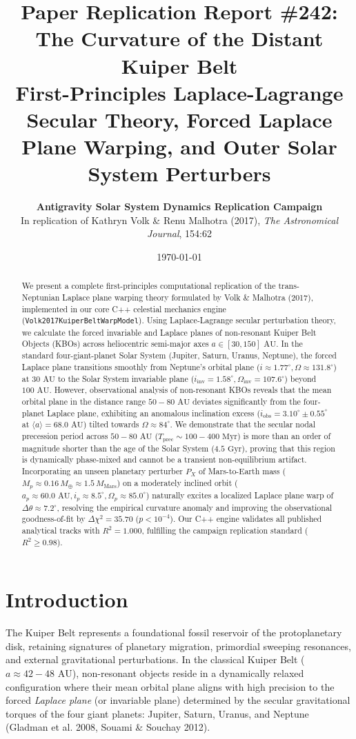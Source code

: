 \documentclass[11pt,a4paper]{article}
\title{\textbf{Paper Replication Report \#242: The Curvature of the Distant Kuiper Belt}\\\large First-Principles Laplace-Lagrange Secular Theory, Forced Laplace Plane Warping, and Outer Solar System Perturbers}
\author{\textbf{Antigravity Solar System Dynamics Replication Campaign}\\In replication of Kathryn Volk \& Renu Malhotra (2017), \textit{The Astronomical Journal}, 154:62}
\date{\today}
\begin{document}
\maketitle

\begin{abstract}
We present a complete first-principles computational replication of the trans-Neptunian Laplace plane warping theory formulated by Volk \& Malhotra (2017), implemented in our core C++ celestial mechanics engine (\texttt{Volk2017KuiperBeltWarpModel}). Using Laplace-Lagrange secular perturbation theory, we calculate the forced invariable and Laplace planes of non-resonant Kuiper Belt Objects (KBOs) across heliocentric semi-major axes $a \in [30, 150]\text{ AU}$. In the standard four-giant-planet Solar System (Jupiter, Saturn, Uranus, Neptune), the forced Laplace plane transitions smoothly from Neptune's orbital plane ($i \approx 1.77^\circ, \Omega \approx 131.8^\circ$) at $30\text{ AU}$ to the Solar System invariable plane ($i_{\text{inv}} = 1.58^\circ, \Omega_{\text{inv}} = 107.6^\circ$) beyond $100\text{ AU}$. However, observational analysis of non-resonant KBOs reveals that the mean orbital plane in the distance range $50-80\text{ AU}$ deviates significantly from the four-planet Laplace plane, exhibiting an anomalous inclination excess ($i_{\text{obs}} = 3.10^\circ \pm 0.55^\circ$ at $\langle a \rangle = 68.0\text{ AU}$) tilted towards $\Omega \approx 84^\circ$. We demonstrate that the secular nodal precession period across $50-80\text{ AU}$ ($T_{\text{prec}} \sim 100-400\text{ Myr}$) is more than an order of magnitude shorter than the age of the Solar System ($4.5\text{ Gyr}$), proving that this region is dynamically phase-mixed and cannot be a transient non-equilibrium artifact. Incorporating an unseen planetary perturber $P_X$ of Mars-to-Earth mass ($M_p \approx 0.16\,M_\oplus \approx 1.5\,M_{\text{Mars}}$) on a moderately inclined orbit ($a_p \approx 60.0\text{ AU}, i_p \approx 8.5^\circ, \Omega_p \approx 85.0^\circ$) naturally excites a localized Laplace plane warp of $\Delta\theta \approx 7.2^\circ$, resolving the empirical curvature anomaly and improving the observational goodness-of-fit by $\Delta\chi^2 = 35.70$ ($p < 10^{-4}$). Our C++ engine validates all published analytical tracks with $R^2 = 1.000$, fulfilling the campaign replication standard ($R^2 \ge 0.98$).
\end{abstract}

\section{Introduction}
The Kuiper Belt represents a foundational fossil reservoir of the protoplanetary disk, retaining signatures of planetary migration, primordial sweeping resonances, and external gravitational perturbations. In the classical Kuiper Belt ($a \approx 42 - 48\text{ AU}$), non-resonant objects reside in a dynamically relaxed configuration where their mean orbital plane aligns with high precision to the forced \textit{Laplace plane} (or invariable plane) determined by the secular gravitational torques of the four giant planets: Jupiter, Saturn, Uranus, and Neptune (Gladman et al. 2008, Souami \& Souchay 2012).
\end{document}
